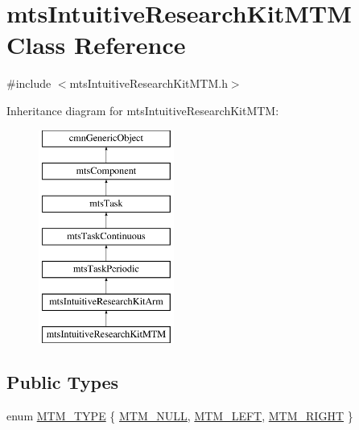 \hypertarget{classmts_intuitive_research_kit_m_t_m}{}\section{mts\+Intuitive\+Research\+Kit\+M\+T\+M Class Reference}
\label{classmts_intuitive_research_kit_m_t_m}


{\ttfamily \#include $<$mts\+Intuitive\+Research\+Kit\+M\+T\+M.\+h$>$}

Inheritance diagram for mts\+Intuitive\+Research\+Kit\+M\+T\+M\+:\begin{figure}[H]
\begin{center}
\leavevmode
\includegraphics[height=7.000000cm]{d2/d1a/classmts_intuitive_research_kit_m_t_m}
\end{center}
\end{figure}
\subsection*{Public Types}
\begin{DoxyCompactItemize}
\item 
enum \hyperlink{classmts_intuitive_research_kit_m_t_m_a2122075f3ef6c751e5bf65b690bf5b69}{M\+T\+M\+\_\+\+T\+Y\+P\+E} \{ \hyperlink{classmts_intuitive_research_kit_m_t_m_a2122075f3ef6c751e5bf65b690bf5b69a9f51be777b8da63c667b740284ff3001}{M\+T\+M\+\_\+\+N\+U\+L\+L}, 
\hyperlink{classmts_intuitive_research_kit_m_t_m_a2122075f3ef6c751e5bf65b690bf5b69a3f0aff93b3bf7ee2002a1ec63be37144}{M\+T\+M\+\_\+\+L\+E\+F\+T}, 
\hyperlink{classmts_intuitive_research_kit_m_t_m_a2122075f3ef6c751e5bf65b690bf5b69ae91ef5d851b669c39fc7d9a62a4b6725}{M\+T\+M\+\_\+\+R\+I\+G\+H\+T}
 \}
\end{DoxyCompactItemize}
